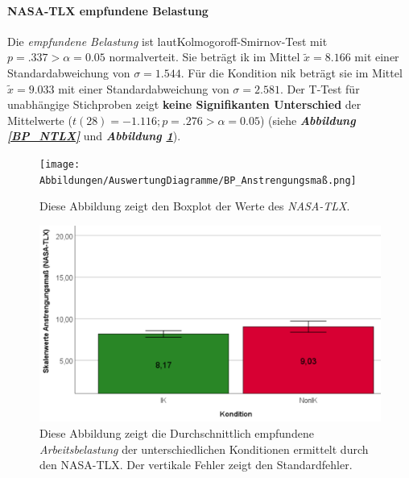 \documentclass[a4paper,11pt]{article}%
\renewcommand{\\}{\vspace*{0.5\baselineskip} \newline}
\begin{document}
\paragraph{NASA-TLX \glqq{}empfundene Belastung\dq{}} 
Die \textit{empfundene Belastung} ist laut\newline Kolmogoroff-Smirnov-Test mit $p = .337 > \alpha = 0.05$ normalverteit. 
Sie beträgt \ac{ik} im Mittel $\tilde x = 8.166$ mit einer Standardabweichung von $\sigma = 1.544$.
Für die Kondition \ac{nik} beträgt sie im Mittel $\tilde x = 9.033$ mit einer Standardabweichung von $\sigma = 2.581$. 
Der T-Test für unabhängige Stichproben zeigt \textbf{keine Signifikanten Unterschied} der Mittelwerte ($t(28) = -1.116; p = .276 > \alpha = 0.05$) (siehe \textbf{\textit{Abbildung \ref{BP_NTLX}}} und \textbf{\textit{Abbildung \ref{SD_NTLX_Mittelwerte}}}).

	\begin{figure}[H]
   \begin{minipage}[t]{.5\linewidth} %
      \texttt{[image: Abbildungen/AuswertungDiagramme/BP\_Anstrengungsmaß.png]}
      \caption[Boxplot der \textit{NASA-TLX}-Werte]{Diese Abbildung zeigt den Boxplot der Werte des \textit{NASA-TLX}.}
            \label{BP_NTLX}
   \end{minipage}
   \hspace{.02\linewidth}%
   \begin{minipage}[t]{.5\linewidth} %
     \includegraphics[width=\linewidth]{Abbildungen/AuswertungDiagramme/SD_NTLX_Mittelwerte.png}
      \caption[Durchschnittlich \textit{empfundene Arbeitsbelastung}]{Diese Abbildung zeigt die Durchschnittlich empfundene \textit{Arbeitsbelastung} der unterschiedlichen Konditionen ermittelt durch den NASA-TLX. Der vertikale Fehler zeigt den Standardfehler.}
       \label{SD_NTLX_Mittelwerte}
   \end{minipage}
\end{figure}
\end{document}
